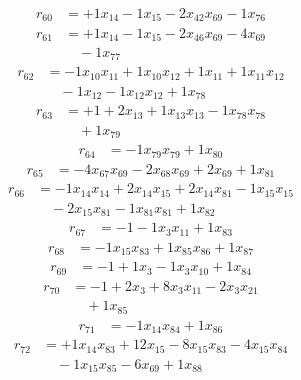 \[\begin{aligned}
r_{60} &= + 1 x_{14} - 1 x_{15} - 2 x_{42} x_{69} - 1 x_{76}
\end{aligned}\]
\[\begin{aligned}
r_{61} &= + 1 x_{14} - 1 x_{15} - 2 x_{46} x_{69} - 4 x_{69} \\
 &\quad - 1 x_{77}
\end{aligned}\]
\[\begin{aligned}
r_{62} &= - 1 x_{10} x_{11} + 1 x_{10} x_{12} + 1 x_{11} + 1 x_{11} x_{12} \\
 &\quad - 1 x_{12} - 1 x_{12} x_{12} + 1 x_{78}
\end{aligned}\]
\[\begin{aligned}
r_{63} &= + 1 + 2 x_{13} + 1 x_{13} x_{13} - 1 x_{78} x_{78} \\
 &\quad + 1 x_{79}
\end{aligned}\]
\[\begin{aligned}
r_{64} &= - 1 x_{79} x_{79} + 1 x_{80}
\end{aligned}\]
\[\begin{aligned}
r_{65} &= - 4 x_{67} x_{69} - 2 x_{68} x_{69} + 2 x_{69} + 1 x_{81}
\end{aligned}\]
\[\begin{aligned}
r_{66} &= - 1 x_{14} x_{14} + 2 x_{14} x_{15} + 2 x_{14} x_{81} - 1 x_{15} x_{15} \\
 &\quad - 2 x_{15} x_{81} - 1 x_{81} x_{81} + 1 x_{82}
\end{aligned}\]
\[\begin{aligned}
r_{67} &= - 1 - 1 x_{3} x_{11} + 1 x_{83}
\end{aligned}\]
\[\begin{aligned}
r_{68} &= - 1 x_{15} x_{83} + 1 x_{85} x_{86} + 1 x_{87}
\end{aligned}\]
\[\begin{aligned}
r_{69} &= - 1 + 1 x_{3} - 1 x_{3} x_{10} + 1 x_{84}
\end{aligned}\]
\[\begin{aligned}
r_{70} &= - 1 + 2 x_{3} + 8 x_{3} x_{11} - 2 x_{3} x_{21} \\
 &\quad + 1 x_{85}
\end{aligned}\]
\[\begin{aligned}
r_{71} &= - 1 x_{14} x_{84} + 1 x_{86}
\end{aligned}\]
\[\begin{aligned}
r_{72} &= + 1 x_{14} x_{83} + 12 x_{15} - 8 x_{15} x_{83} - 4 x_{15} x_{84} \\
 &\quad - 1 x_{15} x_{85} - 6 x_{69} + 1 x_{88}
\end{aligned}\]

